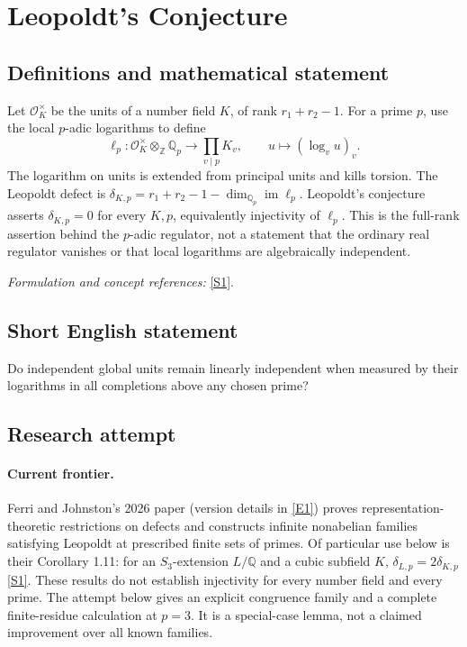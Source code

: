 \documentclass[11pt,a4paper]{article}
\newcommand{\Z}{\mathbb{Z}}
\newcommand{\Q}{\mathbb{Q}}
\newcommand{\sref}[2]{\hyperlink{source:#1:#2}{[S#2]}}
\newcommand{\eref}[2]{\hyperlink{extra:#1:#2}{[E#2]}}
\newif\ifshowcatalogue
\newcommand{\cataloguescope}[1]{\ifshowcatalogue
 \paragraph{Exact scope in the supplied catalogue.}
 \begin{quote}\small #1\end{quote}\fi}
\numberwithin{equation}{section}
\begin{document}
\setcounter{section}{0}
\clearpage
\section*{\texorpdfstring{Leopoldt's Conjecture}{Leopoldt's Conjecture}}\label{statement}
\subsection{Definitions and mathematical statement}
Let $\mathcal O_K^\times$ be the units of a number field $K$, of rank $r_1+r_2-1$. For a prime $p$, use the local $p$-adic logarithms to define
\[
 \ell_p:\mathcal O_K^\times\otimes_{\Z}\Q_p\longrightarrow\prod_{v\mid p}K_v,
 \qquad u\longmapsto(\log_v u)_v.
\]
The logarithm on units is extended from principal units and kills torsion. The Leopoldt defect is
$\delta_{K,p}=r_1+r_2-1-\dim_{\Q_p}\operatorname{im}\ell_p$.
Leopoldt's conjecture asserts $\delta_{K,p}=0$ for every $K,p$, equivalently injectivity of $\ell_p$. This is the full-rank assertion behind the $p$-adic regulator, not a statement that the ordinary real regulator vanishes or that local logarithms are algebraically independent.
\par\smallskip\textit{Formulation and concept references:} \sref{statement}{1}.
\cataloguescope{Prove or disprove that for every number field K and every prime p, the Leopoldt defect of K at p is zero, equivalently that the p-adic regulator has the conjectured full rank.}
\subsection{Short English statement}
Do independent global units remain linearly independent when measured by their logarithms in all completions above any chosen prime?
\subsection{Research attempt}

\paragraph{Current frontier.}
Ferri and Johnston's 2026 paper (version details in \eref{statement}{1}) proves representation-theoretic restrictions
on defects and constructs infinite nonabelian families satisfying Leopoldt
at prescribed finite sets of primes. Of particular use below is their
Corollary 1.11: for an $S_3$-extension $L/\Q$ and a cubic subfield $K$,
$\delta_{L,p}=2\delta_{K,p}$ \sref{statement}{1}. These results do not establish
injectivity for every number field and every prime. The attempt below gives
an explicit congruence family and a complete finite-residue calculation at
$p=3$. It is a special-case lemma, not a claimed improvement over all known
families.
\end{document}
